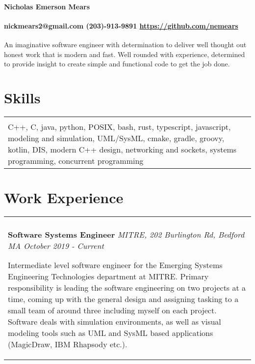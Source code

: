 \documentclass[10pt]{article}
\begin{document}
\paragraph{\centering \huge Nicholas Emerson Mears \\ }
\paragraph{\centering nickmears2@gmail.com (203)-913-9891 \url{https://github.com/nemears}\\}

An imaginative software engineer with determination to deliver well thought out honest work that is modern and fast. Well rounded with experience, 
determined to provide insight to create simple and functional code to get the job done.

\section*{Skills}
\begin{tabular}{p{18.5cm}}
  \hline
  \multicolumn{1}{c}{} \\
  C++, C, java, python, POSIX, bash, rust, typescript, javascript, modeling and simulation, UML/SysML, cmake, gradle, groovy, kotlin, 
  DIS, modern C++ design, networking and sockets, systems programming, concurrent programming
\end{tabular}

\section*{Work Experience}
\begin{tabular}{p{18.5cm}}
    \hline
    \multicolumn{1}{c}{} \\
    \large \textbf{Software Systems Engineer} \normalsize \textit{MITRE, 202 Burlington Rd, Bedford MA \hfill October 2019 - Current}

    \> Intermediate level software engineer for the Emerging Systems Engineering Technologies department at MITRE. Primary responsibility 
    is leading the software engineering on two projects at a time, coming up with the general design and assigning tasking to a small team
    of around three including myself on each project. Software deals with simulation environments, as well as visual modeling tools such as 
    UML and SysML based applications (MagicDraw, IBM Rhapsody etc.).

\end{tabular}
\end{document}
